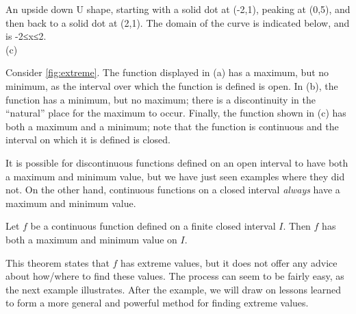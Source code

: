 {{}{An upside down U shape, starting with a solid dot at (-2,1), peaking at (0,5), and then back to a solid dot at (2,1).  The domain of the curve is indicated below, and is -2≤x≤2.}
\\(c)}

Consider \autoref{fig:extreme}. The function displayed in (a) has a maximum, but no minimum, as the interval over which the function is defined is open. In (b), the function has a minimum, but no maximum; there is a discontinuity in the ``natural'' place for the maximum to occur. Finally, the function shown in (c) has both a maximum and a minimum; note that the function is continuous and the interval on which it is defined is closed. 
 
It is possible for discontinuous functions defined on an open interval to have both a maximum and minimum value, but we have just seen examples where they did not. On the other hand, continuous functions on a closed interval \emph{always} have a maximum and minimum value.
 
\begin{theorem}\label{thm:extremeVal}
Let $f$ be a continuous function defined on a finite closed interval $I$. Then $f$ has both a maximum and minimum value on $I$.%
\end{theorem}


This theorem states that $f$ has extreme values, but it does not offer any advice about how/where to find these values. The process can seem to be fairly easy, as the next example illustrates. After the example, we will draw on lessons learned to form a more general and powerful method for finding extreme values.

